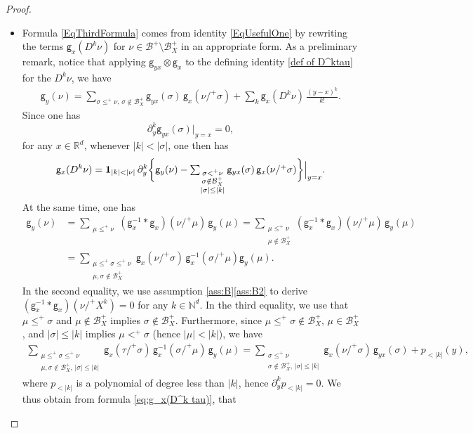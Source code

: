 \documentclass[10pt]{amsart}
\theoremstyle{plain}
\theoremstyle{definition}
\newcommand{\unit}{\mathbf{1}}
\newcommand{\sfg}{\mathsf{g}}
\newcommand{\bbN}{\mathbb{N}}
\newcommand{\bbR}{\mathbb{R}}
\newcommand{\mcB}{\mathcal{B}}
\begin{document}
\begin{proof}
\begin{itemize}
\item
Formula \eqref{EqThirdFormula} comes from identity \eqref{EqUsefulOne} by rewriting the terms ${\sfg}_x(D^k\nu)$ for $\nu\in\mcB^+\setminus\mcB_X^+$ in an appropriate form. As a preliminary remark, notice that applying $\sfg_{yx}\otimes\sfg_x$ to the defining identity \eqref{def of D^ktau} for the $D^k\nu$, we have
\begin{align*}
\sfg_y(\nu) = \sum_{\sigma\leq^+\nu,\, \sigma\notin\mcB_X^+} \sfg_{yx}(\sigma)\,\sfg_x(\nu/^+\sigma) + \sum_k\sfg_x(D^k\nu)\,\frac{(y-x)^k}{k!}.
\end{align*}
Since one has
\[
\partial_y^k\sfg_{yx}(\sigma)\big|_{y=x} = 0,
\]
for any $x\in\bbR^d$, whenever $|k| < |\sigma|$, one then has
\begin{align}\label{eq:g_x(D^k tau)}
{\sf g}_x(D^k\nu) = \unit_{|k|<|\nu|}\, \partial_y^k\bigg\{\sfg_y(\nu) - \textstyle\sum_{\substack{\sigma<^+\nu\\\sigma\notin\mcB_X^+\\|\sigma| \leq |k|}} \sfg_{yx}(\sigma)\,\sfg_x(\nu/^+\sigma)\bigg\}\Big|_{y=x}.
\end{align}
At the same time, one has
\begin{align*}
\sfg_y(\nu) &= \sum_{\substack{\mu\le^+\nu}} (\sfg_x^{-1}*\sfg_x)(\nu/^+\mu)\,\sfg_y(\mu) = \sum_{\substack{\mu\le^+\nu \\ \mu\notin\mcB_X^+}} (\sfg_x^{-1}*\sfg_x)(\nu/^+\mu)\,\sfg_y(\mu) \\
&= \sum_{\substack{\mu\le^+\sigma\le^+\nu \\ \mu,\sigma\notin\mcB_X^+}} \sfg_x(\nu/^+\sigma)\,\sfg_x^{-1}(\sigma/^+\mu)\sfg_y(\mu).
\end{align*}
In the second equality, we use assumption \ref{ass:B}\eqref{ass:B2} to derive $(\sfg_x^{-1}*\sfg_x)(\nu/^+X^k)=0$ for any $k\in\bbN^d$.
In the third equality, we use that $\mu\le^+\sigma$ and $\mu\notin\mcB_X^+$ implies $\sigma\notin\mcB_X^+$. Furthermore, since $\mu\le^+\sigma\notin\mcB_X^+$, $\mu\in\mcB_X^+$, and $|\sigma|\le |k|$ implies $\mu<^+\sigma$ (hence $|\mu|<|k|$), we have
\begin{align*}
\sum_{\substack{\mu\le^+\sigma\le^+\nu \\ \mu,\sigma\notin\mcB_X^+,\,|\sigma|\le|k|}} \sfg_x(\tau/^+\sigma)\,\sfg_x^{-1}(\sigma/^+\mu)\,\sfg_y(\mu) = \sum_{\substack{\sigma\le^+\nu \\ \sigma\notin\mcB_X^+,\,|\sigma|\le|k|}} \sfg_x(\nu/^+\sigma)\,\sfg_{yx}(\sigma)+p_{<|k|}(y),
\end{align*}
where $p_{<|k|}$ is a polynomial of degree less than $|k|$, hence $\partial^k_yp_{<|k|}=0$. We thus obtain from formula \eqref{eq:g_x(D^k tau)}, that

\end{itemize}
\end{proof}
\end{document}
